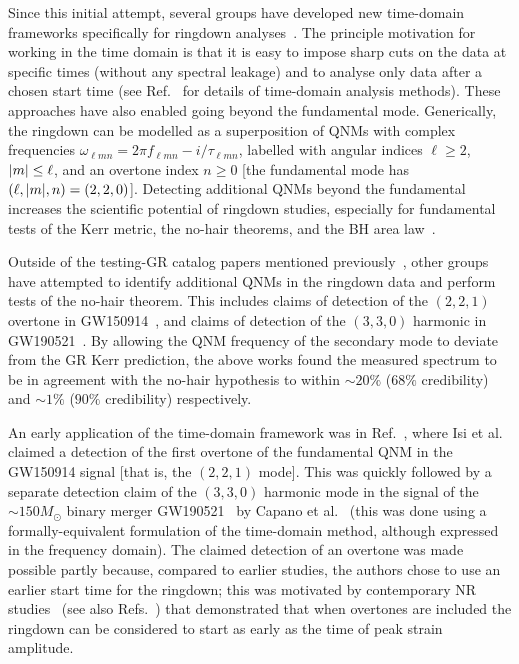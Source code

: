 Since this initial attempt, several groups have developed new time-domain frameworks specifically for ringdown analyses~\cite{Carullo:2019flw, Isi:2019aib, Capano:2021etf}.
The principle motivation for working in the time domain is that it is easy to impose sharp cuts on the data at specific times (without any spectral leakage) and to analyse only data after a chosen start time (see Ref.~\cite{Isi:2021iql} for details of time-domain analysis methods).
These approaches have also enabled going beyond the fundamental mode. 
Generically, the ringdown can be modelled as a superposition of QNMs with complex frequencies $\omega_{\ell m n} = 2\pi f_{\ell m n} - i/\tau_{\ell m n}$, labelled with angular indices $\ell\geq 2$, $\abs{m}\leq\ell$, and an overtone index $n \geq 0$ [the fundamental mode has $(\ell, \abs{m}, n) = (2, 2, 0)$].
Detecting additional QNMs beyond the fundamental increases the scientific potential of ringdown studies, especially for fundamental tests of the Kerr metric, the no-hair theorems, and the BH area law~\cite{Dreyer:2003bv, Berti:2005ys, Gossan:2011ha, Brito:2018rfr, Carullo:2019flw, Isi:2019aib, Isi:2020tac}.

Outside of the testing-GR catalog papers mentioned previously~\cite{LIGOScientific:2020tif, LIGOScientific:2021sio}, other groups have attempted to identify additional QNMs in the ringdown data and perform tests of the no-hair theorem. 
This includes claims of detection of the $(2,2,1)$ overtone in GW150914~\cite{Isi:2019aib}, and claims of detection of the $(3,3,0)$ harmonic in GW190521~\cite{Capano:2021etf}. 
By allowing the QNM frequency of the secondary mode to deviate from the GR Kerr prediction, the above works found the measured spectrum to be in agreement with the no-hair hypothesis to within $\sim 20\%$ ($68\%$ credibility) and $\sim 1\%$ ($90\%$ credibility) respectively.

An early application of the time-domain framework was in Ref.~\cite{Isi:2019aib}, where Isi et al. claimed a detection of the first overtone of the fundamental QNM in the GW150914 signal [that is, the $(2, 2, 1)$ mode]. 
This was quickly followed by a separate detection claim of the $(3,3,0)$ harmonic mode in the signal of the $\sim 150M_\odot$ binary merger GW190521~\cite{LIGOScientific:2020iuh} by Capano et al.~\cite{Capano:2021etf} (this was done using a formally-equivalent formulation of the time-domain method, although expressed in the frequency domain).
The claimed detection of an overtone was made possible partly because, compared to earlier studies, the authors chose to use an earlier start time for the ringdown; this was motivated by contemporary NR studies~\cite{Giesler:2019uxc} (see also Refs.~\cite{Bhagwat:2019dtm, Ota:2019bzl, Cook:2020otn, JimenezForteza:2020cve, Dhani:2020nik, Finch:2021iip, Forteza:2021wfq, Dhani:2021vac, MaganaZertuche:2021syq}) that demonstrated that when overtones are included the ringdown can be considered to start as early as the time of peak strain amplitude. 

